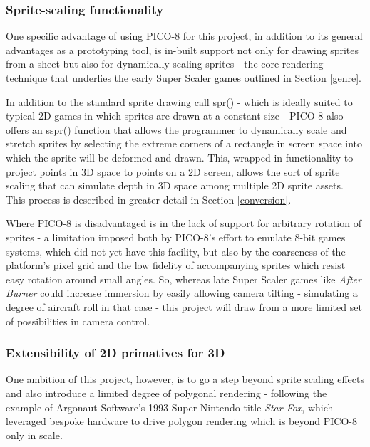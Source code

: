 \documentclass[11pt]{article}
\begin{document}
\subsubsection*{Sprite-scaling functionality}
One specific advantage of using PICO-8 for this project, in addition to its general
advantages as a prototyping tool, is in-built support not only for drawing sprites
from a sheet but also for dynamically scaling sprites - the core rendering technique
that underlies the early Super Scaler games outlined in Section \ref{genre}.

In addition to the standard sprite drawing call spr() - which is ideally suited to
typical 2D games in which sprites are drawn at a constant size - PICO-8 also offers
an sspr() function that allows the programmer to dynamically scale and stretch sprites
by selecting the extreme corners of a rectangle in screen space into which the sprite
will be deformed and drawn. This, wrapped in functionality to project points in 3D space
to points on a 2D screen, allows the sort of sprite scaling that can simulate depth in 3D
space among multiple 2D sprite assets. This process is described in greater detail in
Section \ref{conversion}.

Where PICO-8 is disadvantaged is in the lack of support for arbitrary rotation of sprites -
a limitation imposed both by PICO-8's effort to emulate 8-bit games systems, which did not yet
have this facility, but also by the coarseness of the platform's pixel grid and the low fidelity
of accompanying sprites which resist easy rotation around small angles. So, whereas late
Super Scaler games like \textit{After Burner} could increase immersion by easily allowing
camera tilting - simulating a degree of aircraft roll in that case - this project will
draw from a more limited set of possibilities in camera control.

\subsubsection*{Extensibility of 2D primatives for 3D}
One ambition of this project, however, is to go a step beyond sprite scaling effects
and also introduce a limited degree of polygonal rendering - following the example of
Argonaut Software's 1993 Super Nintendo title \textit{Star Fox}, which leveraged bespoke
hardware to drive polygon rendering which is beyond PICO-8 only in scale.
\end{document}
